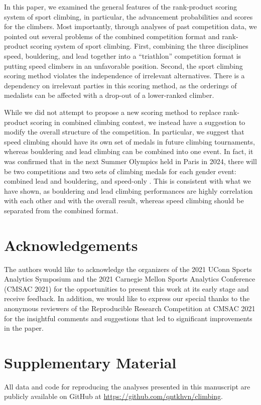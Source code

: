 \documentclass[letterpaper, inpress]{jds} %
\begin{document}
In this paper, we examined the general features of the rank-product
scoring system of sport climbing, in particular, the advancement
probabilities and scores for the climbers. Most importantly, through
analyses of past competition data, we pointed out several problems of
the combined competition format and rank-product scoring system of sport
climbing. First, combining the three disciplines speed, bouldering, and
lead together into a ``triathlon'' competition format is putting speed
climbers in an unfavorable position. Second, the sport climbing scoring
method violates the independence of irrelevant alternatives. There is a
dependency on irrelevant parties in this scoring method, as the
orderings of medalists can be affected with a drop-out of a lower-ranked
climber.

While we did not attempt to propose a new scoring method to replace
rank-product scoring in combined climbing contest, we instead have a
suggestion to modify the overall structure of the competition. In
particular, we suggest that speed climbing should have its own set of
medals in future climbing tournaments, whereas bouldering and lead
climbing can be combined into one event. In fact, it was confirmed that
in the next Summer Olympics held in Paris in 2024, there will be two
competitions and two sets of climbing medals for each gender event:
combined lead and bouldering, and speed-only \citep{goh2020}. This is
consistent with what we have shown, as bouldering and lead climbing
performances are highly correlation with each other and with the overall
result, whereas speed climbing should be separated from the combined
format.

\section*{Acknowledgements}
\label{acknowledgements}

The authors would like to acknowledge the organizers of the 2021 UConn
Sports Analytics Symposium and the 2021 Carnegie Mellon Sports Analytics
Conference (CMSAC 2021) for the opportunities to present this work at
its early stage and receive feedback. In addition, we would like to
express our special thanks to the anonymous reviewers of the
Reproducible Research Competition at CMSAC 2021 for the insightful
comments and suggestions that led to significant improvements in the
paper.


\section*{Supplementary Material}
\label{supplementary-material}

All data and code for reproducing the analyses presented in this
manuscript are publicly available on GitHub at
\url{https://github.com/qntkhvn/climbing}.



\end{document}
